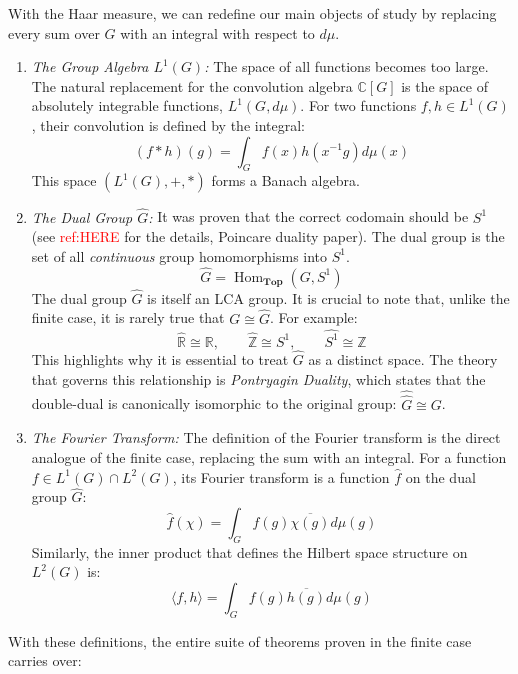 \documentclass{article}
\newcommand{\C}{{\mathbb{C}}}
\newcommand{\R}{{\mathbb{R}}}
\newcommand{\Z}{{\mathbb{Z}}}
\newcommand{\Top}{{\textbf{Top}}}
\newcommand{\Hom}{{\operatorname{Hom}}}
\begin{document}
With the Haar measure, we can redefine our main objects of study by replacing every sum over $G$ with an integral with respect to $d\mu$.

\begin{enumerate}
	\item \emph{The Group Algebra $L^1(G)$:} The space of all functions becomes too large. The natural replacement for the convolution algebra $\C[G]$ is the space of absolutely integrable functions, $L^1(G, d\mu)$. For two functions $f, h \in L^1(G)$, their convolution is defined by the integral:
	\[
		(f*h)(g) = \int_G f(x) h(x^{-1}g) d\mu(x)
	\]
	This space $(L^1(G), +, *)$ forms a Banach algebra.

	\item \emph{The Dual Group $\widehat{G}$:} It was proven that the correct codomain should be $S^1$ (see
		\textcolor{red}{ref:HERE} for the details, Poincare duality paper). The dual group is the set of all \emph{continuous} group homomorphisms into $S^1$.
	\[
		\widehat{G} = \Hom_{\Top}(G, S^1)
	\]
	The dual group $\widehat{G}$ is itself an LCA group. It is crucial to note that, unlike the finite case, it is rarely true that $G \cong \widehat{G}$. For example:
	\[
		\widehat{\R} \cong \R, \qquad \widehat{\Z} \cong S^1, \qquad \widehat{S^1} \cong \Z
	\]
	This highlights why it is essential to treat $\hat{G}$ as a distinct space. The theory that governs this relationship is \emph{Pontryagin Duality}, which states that the double-dual is canonically isomorphic to the original group: $\widehat{\widehat{G}} \cong G$.

	\item \emph{The Fourier Transform:} The definition of the Fourier transform is the direct analogue of the finite case, replacing the sum with an integral. For a function $f \in L^1(G)\cap L^2(G)$, its Fourier transform is a function $\hat{f}$ on the dual group $\hat{G}$:
	\[
		\hat{f}(\chi) = \int_G f(g) \overline{\chi(g)} d\mu(g)
	\]
	Similarly, the inner product that defines the Hilbert space structure on $L^2(G)$ is:
	\[
		\langle f, h \rangle = \int_G f(g) \overline{h(g)} d\mu(g)
	\]
\end{enumerate}

With these definitions, the entire suite of theorems proven in the finite case carries over:
\end{document}
